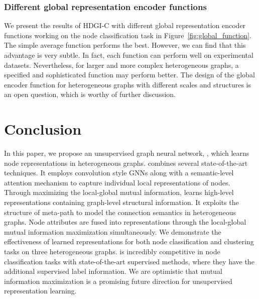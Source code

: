 \documentclass[conference]{IEEEtran}
\begin{document}
\subsubsection{Different global representation encoder functions}
We present the results of HDGI-C with different global representation encoder functions working on the node classification task in Figure~\ref{fig:global_function}. The simple average function performs the best. However, we can find that this advantage is very subtle. In fact, each function can perform well on experimental datasets. Nevertheless, for larger and more complex heterogeneous graphs, a specified and sophisticated function may perform better. The design of the global encoder function for heterogeneous graphs with different scales and structures is an open question, which is worthy of further discussion.
	
\section{Conclusion}
\label{sec:conclusion}
	In this paper, we propose an unsupervised graph neural network, {\our}, which learns node representations in heterogeneous graphs. {\our} combines several state-of-the-art techniques. It employs convolution style GNNs along with a semantic-level attention mechanism to capture individual local representations of nodes. Through maximizing the local-global mutual information, {\our} learns high-level representations containing graph-level structural information. It exploits the structure of meta-path to model the connection semantics in heterogeneous graphs. Node attributes are fused into representations through the local-global mutual information maximization simultaneously. 
	We demonstrate the effectiveness of learned representations for both node classification and clustering tasks on three heterogeneous graphs. {\our} is incredibly competitive in node classification tasks with state-of-the-art supervised methods, where they have the additional supervised label information. We are optimistic that mutual information maximization is a promising future direction for unsupervised representation learning.



	
	
\end{document}
